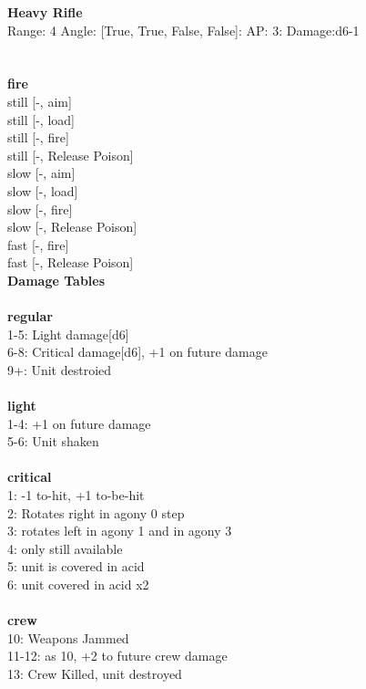 {\bf Heavy Rifle } \\



Range: 4  Angle: [True, True, False, False]: AP: 3: Damage:d6-1 \\




 
\ \\




\ \\ {\bf fire } \\
still [-, aim] \\
still [-, load] \\
still [-, fire] \\
still [-, Release Poison] \\
slow [-, aim] \\
slow [-, load] \\
slow [-, fire] \\
slow [-, Release Poison] \\
fast [-, fire] \\
fast [-, Release Poison] \\


{\bf Damage Tables} \\
\ \\ {\bf regular } \\
1-5: Light damage[d6] \\
6-8: Critical damage[d6], +1 on future damage \\
9+: Unit destroied \\
\ \\ {\bf light } \\
1-4: +1 on future damage \\
5-6: Unit shaken \\
\ \\ {\bf critical } \\
1: -1 to-hit, +1 to-be-hit \\
2: Rotates right in agony 0 step \\
3: rotates left in agony 1 and in agony 3 \\
4: only still available \\
5: unit is covered in acid \\
6: unit covered in acid x2 \\
\ \\ {\bf crew } \\
10: Weapons Jammed \\
11-12: as 10, +2 to future crew damage \\
13: Crew Killed, unit destroyed \\











